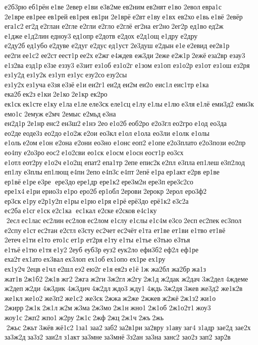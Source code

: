 е2б3рю еб1рён е1ве 	2евер е1ви 
е3в2ме ев2ним ев2нят е1во 	2евол евра1с 
2е1вре ев1рее ев1рей ев1рея 	ев1ри 
2е1врё е2вт е1ву е1вх 	ев2хо е1вь е1вё 	2евёр 
ега1с2 ег2д е2глан 	е2гле 	е2гли 	е2гло 	е2глё 	ег2на 	ег2но 2ег2р 	ед1во ед2ж 	е1дже е1д2лин едноу3 ед1опр е2дотв 	е2дох 
е2д1ощ 	е1дру 
е2дру  
е2ду2б ед1убо е2дуве 	е2дуг 	е2дус ед1уст 
2е3душ 	е2дын е1е е2евид 
ее2в1р 	ее2ги ее1с2 	ее2ст еест1р ее2х е2жг е4ждев 	еж3ди 2еже е2ж1р 2ежё еза2вр 	езау3 
е1з2ва 	езд1р е3зе 	еззу3 	е3зит 	ез1об 
ез1о2г 	е1зом 	ез1оп 
ез1о2р 	ез1от 	ез1ош 	ез2ря 
ез1у2д 
ез1у2к 	ез1уп 	ез1ус езу2со езу2сы 
ез1у2х ез1уча е3зя е3зё е1и еи2г1 еи2д еи2м еи2о 	еис1л еис1тр е1ка 	ека2б ек2з е1ки 2е1ко 2е1кр 	ек2ро 	ек1ск ек1сте е1ку е1ла е1ле еле3ск еле1сц е1лу е1лы е1лю е3ля е1лё 
еми3д2 	еми3к 	емо1с 	2емуж е2мч 	2емыс 	е2мьд е3на 
ен2д1р 2е1нр енс2 ен3ш2 е1нэ 2ео е1о2б еоб2ро 
е2о3гл ео2гро е1од 	ео3да 	ео2де еоде3з 	ео2до е1о2ж е2ои 	ео3кл е1ол  	е1ола 	ео3ли 	е1олк 	е1олы 	е1оль е2ом е1он  	е2она 	е2они 	ео3но 	е1онс еоп2 	е1опе е2о3плато е2о3пози 	ео2пр 	ео4пу 
е2о3ро еос2 е1о2сви 	ео1ск 	е1осм 	е1осн еост1р 	ео3сх 	е1отл еот2ру е1о2ч е1о2щ 	епат2 епа1тр 2епе епис2к е2пл 	е3пла еп1леш е3п2лод 	еп1лу 	е3плы еп1лющ е4пн 2епо е4п3с е4пт 2епё е1ра ер1акт е2рв 	ер1ве 	ер1вё е1ре е3ре  ере3до ере1др 
ере1к2 ере3м2н 	ере3п ере3с2со 
ере1х4 е1ри ерио3з е1ро 	еро2б ер1обл 2ерови 2ерокр 	2ерол 
еро3ф2 	ер3ск е1ру е2р1у2п е1ры е1рю е1ря е1рё ерё3до 
ерё1к2 е3с2а 	ес2ба е1сг е1ск е2с1ка  ес1кал 	е2ске е2сков е4с1ку  2есл ес1лас ес2лин ес2лов ес2лом 	е1слу 	е1слы е1с4м е3со 2есп ес2пек ес3пол 	е2спу е1ст ес2тан 	е2стл 	е3сту ес2чет ес2чёт е1та 	ет1ве 	ет1ви 	е1тво 	ет1вё 	2етеч е1ти е1то 	ето1с ет1р 	ет2ря е1ту е1ты 	е1тье 	е3тью 	е3тья 	е1тьё е1тю е1тя е1у2 2еуб 	еуб3р еуз2 еук2ло 
ефи3б2 еф2л 	еф1ре 	еха2т ех1ато ех3вал ех3лоп 	ех1об ех1опо 	ех1ре 	ех1ру 
ех1у2ч 2ецв е1чл е2шл еэ2 ею2г е1я ея2з е1ё 1ж 	жа2бл 	жа2бр жа1з 	жат1в 2ж1б2 2ж1в жг2 2жга ж2ги 3ж2гл ж2гу 2ж1д 	ж2дак 	ж2дач 
3ж2дел 4ждеме 	ж2деп ж2ди 
4ж3дик 
4ж3дич 4ж2дл ждо3 жду1 4ждь 3ж2дя 3жев же3д2 
же1к2в 	же1кл же1о2 же3п2 же1с2 	же3ск 2жжа ж2же 	2жжев ж2жё 2ж1з2 жи1о 	2жирр 2ж1к 2ж1л ж2м ж3ма 2ж3мо 2ж1н жно1 2ж1об 
2ж1о2т1 жоу3 	жоу1с 2жп2 жпо1 ж2ру 2ж1с 2жф 2жц 2ж1ч 2жъ 2жь  2жьс 2жьт 3жёв жё1с2 1за1 заа2 заб2 за2в1ри за2вру 	з1аву заг4 	з1адр 	зае2д 	зае2х 
за3ж2д за3з2 	заи2л 	з1акт за3мне за3мнё 3з2ан 	за3на 	занс2 	зао2з зап2 	зар2в 
